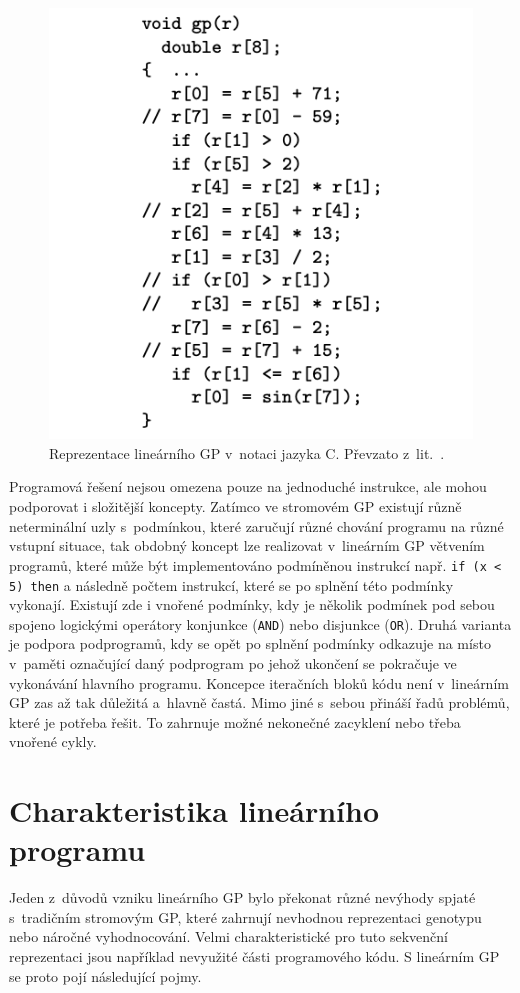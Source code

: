 \begin{figure}[!h]
    \centering
    \includegraphics[scale=0.45]{obrazky-figures/lgp-program-in-c.png}
    \caption{Reprezentace lineárního GP v~notaci jazyka C. Převzato z~lit.~\cite[str. 14]{LGP}.}
    \label{fig:lgp_rep}
\end{figure}

Programová řešení nejsou omezena pouze na jednoduché instrukce, ale mohou podporovat i složitější koncepty. Zatímco ve stromovém GP existují různě neterminální uzly s~podmínkou, které zaručují různé chování programu na různé vstupní situace, tak obdobný koncept lze realizovat v~lineárním GP větvením programů, které může být implementováno podmíněnou instrukcí např. \texttt{if (x < 5) then} a následně počtem instrukcí, které se po splnění této podmínky vykonají. Existují zde i vnořené podmínky, kdy je několik podmínek pod sebou spojeno logickými operátory konjunkce (\texttt{AND}) nebo disjunkce (\texttt{OR}). Druhá varianta je podpora podprogramů, kdy se opět po splnění podmínky odkazuje na místo v~paměti označující daný podprogram po jehož ukončení se pokračuje ve vykonávání hlavního programu. Koncepce iteračních bloků kódu není v~lineárním GP zas až tak důležitá a~hlavně častá. Mimo jiné s~sebou přináší řadů problémů, které je potřeba řešit. To zahrnuje možné nekonečné zacyklení nebo třeba vnořené cykly.

\section{Charakteristika lineárního programu}
Jeden z~důvodů vzniku lineárního GP bylo překonat různé nevýhody spjaté s~tradičním stromovým GP, které zahrnují nevhodnou reprezentaci genotypu nebo náročné vyhodnocování. Velmi charakteristické pro tuto sekvenční reprezentaci jsou například nevyužité části programového kódu. S lineárním GP se proto pojí následující pojmy.


